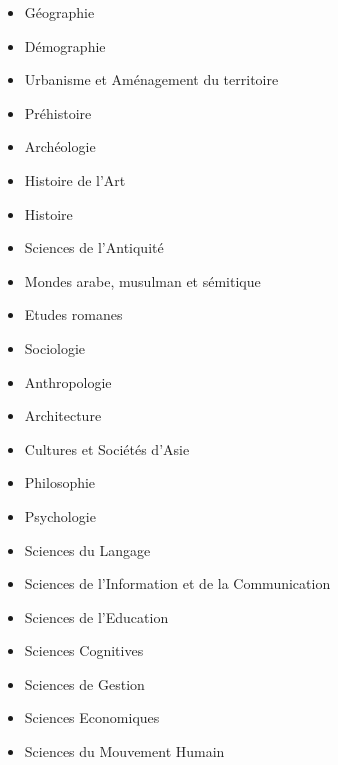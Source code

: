 	\label{ed-355-espaces-cultures-societes}

		\begin{itemize}
		\item Géographie
		\item Démographie
		\item Urbanisme et Aménagement du territoire
		\item Préhistoire
		\item Archéologie
		\item Histoire de l'Art
		\item Histoire
		\item Sciences de l'Antiquité
		\item Mondes arabe, musulman et sémitique
		\item Etudes romanes
		\item Sociologie
		\item Anthropologie
		\item Architecture
		\item Cultures et Sociétés d'Asie
		\end{itemize}

	\label{ed-356-cognition-langage-education}

		\begin{itemize}
		\item Philosophie
		\item Psychologie
		\item Sciences du Langage
		\item Sciences de l'Information et de la Communication
		\item Sciences de l'Education
		\item Sciences Cognitives
		\end{itemize}

	\label{ed-372-sciences-economiques-et-de-gestion}

		\begin{itemize}
		\item Sciences de Gestion
		\item Sciences Economiques
		\end{itemize}

	\label{ed-463-sciences-du-mouvement-humain}

		\begin{itemize}
		\item Sciences du Mouvement Humain 
		\end{itemize}
